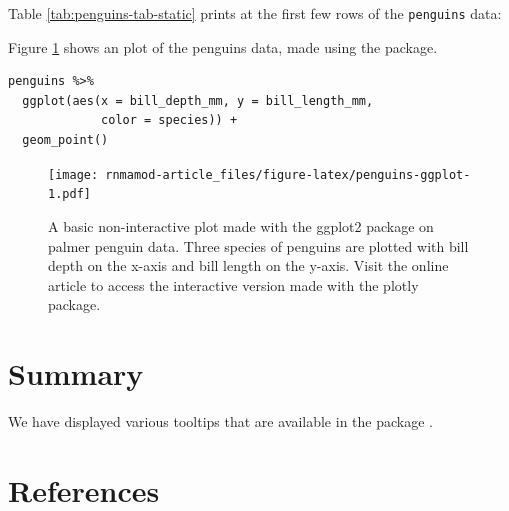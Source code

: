 Table \ref{tab:penguins-tab-static} prints at the first few rows of the \texttt{penguins} data:

Figure \ref{fig:penguins-ggplot} shows an plot of the penguins data, made using the  package.

\begin{verbatim}
penguins %>% 
  ggplot(aes(x = bill_depth_mm, y = bill_length_mm, 
             color = species)) + 
  geom_point()
\end{verbatim}

\begin{figure}
\centering
\texttt{[image: rnmamod-article\_files/figure-latex/penguins-ggplot-1.pdf]}
\caption{\label{fig:penguins-ggplot}A basic non-interactive plot made with the ggplot2 package on palmer penguin data. Three species of penguins are plotted with bill depth on the x-axis and bill length on the y-axis. Visit the online article to access the interactive version made with the plotly package.}
\end{figure}

\hypertarget{summary}{%
\section{Summary}\label{summary}}

We have displayed various tooltips that are available in the package .

\hypertarget{references}{%
\section*{References}\label{references}}

